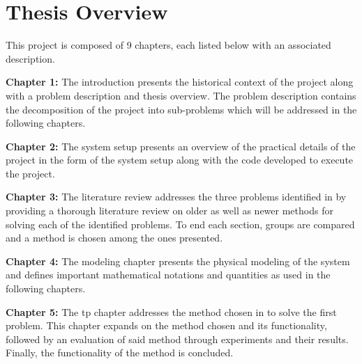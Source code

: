 
\section{Thesis Overview}\label{sec:intro-thesis-overview}

This project is composed of \num{9} chapters, each listed below with an associated description. \medskip


\textbf{Chapter 1:} The introduction presents the historical context of the project along with a problem description and thesis overview. The problem description contains the decomposition of the project into sub-problems which will be addressed in the following chapters. \medskip

\textbf{Chapter 2:} The system setup presents an overview of the practical details of the project in the form of the system setup along with the code developed to execute the project. \medskip

\textbf{Chapter 3:} The literature review addresses the three problems identified in  by providing a thorough literature review on older as well as newer methods for solving each of the identified problems. To end each section, groups are compared and a method is chosen among the ones presented. \medskip

\textbf{Chapter 4:} The modeling chapter presents the physical modeling of the system and defines important mathematical notations and quantities as used in the following chapters. \medskip

\textbf{Chapter 5:} The \gls{tp} chapter addresses the method chosen in  to solve the first problem. This chapter expands on the method chosen and its functionality, followed by an evaluation of said method through experiments and their results. Finally, the functionality of the method is concluded. \medskip

